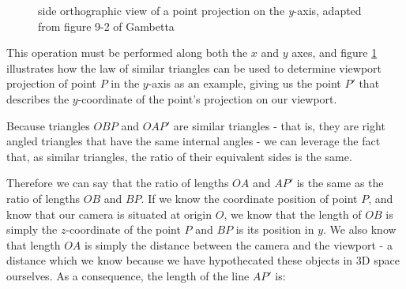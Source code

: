 \documentclass[11pt]{article}
\begin{document}
\begin{figure}
   \centering
   \caption{side orthographic view of a point projection on the \textit{y}-axis, adapted from figure 9-2 of Gambetta
   \cite[p. 106]{gambetta}}
   \label{fig:triangles}
\end{figure}

This operation must be performed along both the $x$ and $y$ axes, and figure \ref{fig:triangles}
illustrates how the law of similar triangles can be used to determine viewport projection of point $P$
in the $y$-axis as an example, giving us the point $P'$ that describes the $y$-coordinate of
the point's projection on our viewport\cite[p. 106]{gambetta}.

Because triangles $OBP$ and $OAP'$ are similar triangles - that is, they are right angled triangles that have the same
internal angles - we can leverage the fact that, as similar triangles, the ratio of their equivalent sides is the same.

Therefore we can say that the ratio of lengths $OA$ and $AP'$ is the same as the ratio of lengths $OB$ and $BP$. If we know
the coordinate position of point $P$, and know that our camera is situated at origin $O$, we know that the length of $OB$ is
simply the $z$-coordinate of the point $P$ and $BP$ is its position in $y$. We also know that length $OA$ is simply the
distance between the camera and the viewport - a distance which we know because we have hypothecated these objects in
3D space ourselves. As a consequence, the length of the line $AP'$ is:
\end{document}
